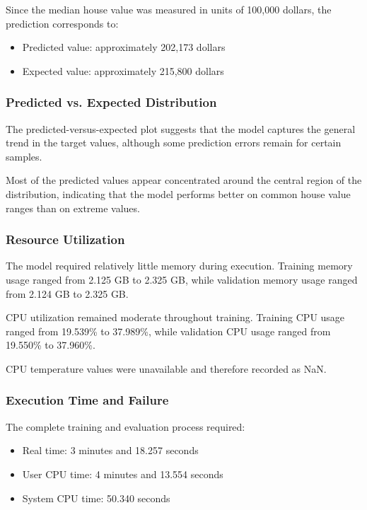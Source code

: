 \documentclass{ieeeaccess}
\begin{document}
Since the median house value was measured in units of 100,000 dollars, the prediction corresponds to:

\begin{itemize}
    \item Predicted value: approximately 202,173 dollars
    \item Expected value: approximately 215,800 dollars
\end{itemize}

\subsubsection{Predicted vs. Expected Distribution}

The predicted-versus-expected plot suggests that the model captures the general trend in the target values, although some prediction errors remain for certain samples.

Most of the predicted values appear concentrated around the central region of the distribution, indicating that the model performs better on common house value ranges than on extreme values.

\subsubsection{Resource Utilization}

The model required relatively little memory during execution. Training memory usage ranged from 2.125 GB to 2.325 GB, while validation memory usage ranged from 2.124 GB to 2.325 GB.

CPU utilization remained moderate throughout training. Training CPU usage ranged from 19.539\% to 37.989\%, while validation CPU usage ranged from 19.550\% to 37.960\%.

CPU temperature values were unavailable and therefore recorded as NaN.

\subsubsection{Execution Time and Failure}

The complete training and evaluation process required:

\begin{itemize}
    \item Real time: 3 minutes and 18.257 seconds
    \item User CPU time: 4 minutes and 13.554 seconds
    \item System CPU time: 50.340 seconds
\end{itemize}
\end{document}
